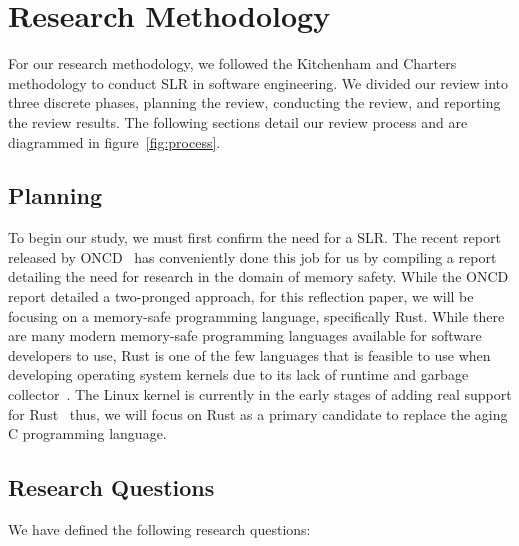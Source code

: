 \documentclass[sigconf]{acmart}
\begin{document}
\section{Research Methodology}

For our research methodology, we followed the Kitchenham and Charters~\cite{Stuart2007-cc} methodology to conduct SLR in software engineering. We divided our review into three discrete phases, planning the review, conducting the review, and reporting the review results. The following sections detail our review process and are diagrammed in figure~\ref{fig:process}.



\subsection{Planning}

To begin our study, we must first confirm the need for a SLR. The recent report released by
ONCD~\cite{United_States_Gov2024-pp} has conveniently done this job for us by compiling a report
detailing the need for research in the domain of memory safety. While the ONCD report detailed a two-pronged approach, for this reflection paper, we will be focusing on a memory-safe programming language,
specifically Rust. While there are many modern memory-safe programming languages available for
software developers to use, Rust is one of the few languages that is feasible to use when developing
operating system kernels due to its lack of runtime and garbage collector~\cite{Ojeda2021-ul}. The Linux kernel is currently
in the early stages of adding real support for
Rust~\cite{The_kernel_development_community_undated-iw} thus, we will focus on Rust as a primary
candidate to replace the aging C programming language.

\subsection{Research Questions}
\label{sec:researchQuestions}

We have defined the following research questions:
\end{document}
